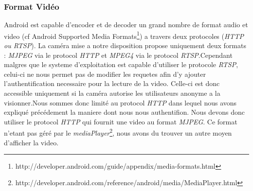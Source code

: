 \subsubsection{Format Vidéo}
Android est capable d'encoder et de decoder un grand nombre de format audio et
video (cf Android Supported Media Formats\footnote{\label{mediaFormat}
http://developer.android.com/guide/appendix/media-formats.html}) a travers
deux protocoles (\textit{HTTP ou RTSP}).\newline
La caméra mise a notre disposition propose uniquement deux formats :
\textit{MJPEG} via le protocol \textit{HTTP} et \textit{MPEG4} via le protocol
\textit{RTSP}.\newline Cependant malgres que le systeme d'exploitation est
capable d'utiliser le protocole \textit{RTSP}, celui-ci ne nous permet pas de
modifier les requetes afin d'y ajouter l'authentification necessaire pour la
lecture de la video. Celle-ci est donc accessible uniquement si la caméra
autorise les utilisateurs anonyme a la visionner.\newline Nous sommes donc
limité au protocol \textit{HTTP} dans lequel nous avons expliqué précédement
la maniere dont nous nous authentifion.\newline\newline
Nous devons donc utiliser le protocol \textit{HTTP} qui fournit une video au
format \textit{MJPEG}. Ce format n'etant pas géré par le
\textit{mediaPlayer}\footnote{\label{mediaPlayer}
http://developer.android.com/reference/android/media/MediaPlayer.html}, nous
avons du trouver un autre moyen d'afficher la video.
